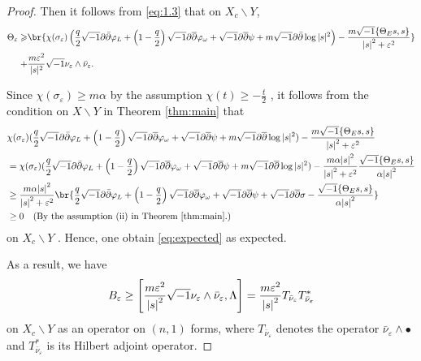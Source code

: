 \documentclass[lang=en,12pt,twoside]{textbook}
\begin{document}
\begin{proof}
Then it follows from \eqref{eq:1.3} that on $X_c\backslash Y$, 
\[
\begin{aligned}
    \Theta_\varepsilon \geqslant &\br{\chi(\sigma_\varepsilon) \left(\frac{q}{2}\sqrt{-1} \partial \bar{\partial} \varphi_{L}+\left(1-\frac{q}{2}\right)\xu\bd\bdd\varphi_\omega+\xu\bd\bdd\psi+m\sqrt{-1} \partial \bar{\partial} \log |s|^2\right)
    -\frac{m\xu \{\Theta_E s,s\}}{\abs{s}^2+\varepsilon^2}}\\
    +&\frac{m \varepsilon^2}{|s|^2}\xu \nu_\varepsilon\wedge \bar\nu_{\varepsilon}.
\end{aligned}
\] 

Since $\chi (\sigma_\varepsilon)\geq m\alpha$ by the assumption $\chi(t)\geq -\frac{t}{2}$  , it follows from the condition on $X\backslash Y$ in Theorem \ref{thm:main}  that 
\begin{align*}
  &\chi (\sigma_\varepsilon) (\frac{q}{2}\sqrt{-1} \partial \bar{\partial} \varphi_{L}+\left(1-\frac{q}{2}\right)\xu\bd\bdd\varphi_\omega+\xu\bd\bdd\psi+m\xu\bd\bdd \log |s|^2)-\frac{m\xu \{\Theta_E s,s\}}{\abs{s}^2+\varepsilon^2}\\ 
& =\chi (\sigma_\varepsilon) (\frac{q}{2}\sqrt{-1} \partial \bar{\partial} \varphi_{L}+\left(1-\frac{q}{2}\right)\xu\bd\bdd\varphi_\omega+\xu\bd\bdd\psi+m\xu\bd\bdd \log |s|^2)-\frac{m\alpha\abs{s}^2 }{\abs{s}^2+\varepsilon^2}\frac{\xu \{\Theta_E s,s\}}{\alpha \abs{s}^2}\\ 
&\geq \frac{m\alpha\abs{s}^2 }{\abs{s}^2+\varepsilon^2} \br{\frac{q}{2}\sqrt{-1} \partial \bar{\partial} \varphi_{L}+\left(1-\frac{q}{2}\right)\xu\bd\bdd\varphi_\omega+\xu\bd\bdd\psi+\xu\bd\bdd \sigma-\frac{\xu \{\Theta_E s,s\}}{\alpha \abs{s}^2}}\\ 
&\geq 0 \quad \text{(By the assumption (ii) in Theorem \ref{thm:main}.)}
\end{align*}
on $X_c\backslash Y$ . Hence, one obtain \eqref{eq:expected} as expected.

{\color{purple} As a result, we have 
\begin{equation}\label{eq:9}
  B_\varepsilon\geq \left[\frac{m\varepsilon^2}{\abs{s}^2}\sqrt{-1}\nu_\varepsilon\wedge\bar\nu_\varepsilon,\Lambda\right]=\frac{m\varepsilon^2}{\abs{s}^2}T_{\bar\nu_\varepsilon}T_{\bar\nu_\varepsilon}^*
\end{equation}}
on $X_c\backslash Y$ as an operator on $(n,1)$ forms, where $T_{\bar\nu_\varepsilon}$  denotes the operator $\bar\nu_\varepsilon\wedge\bullet$ and $T_{\bar\nu_\varepsilon}^*$ is its Hilbert adjoint operator.


\end{proof}
\end{document}
